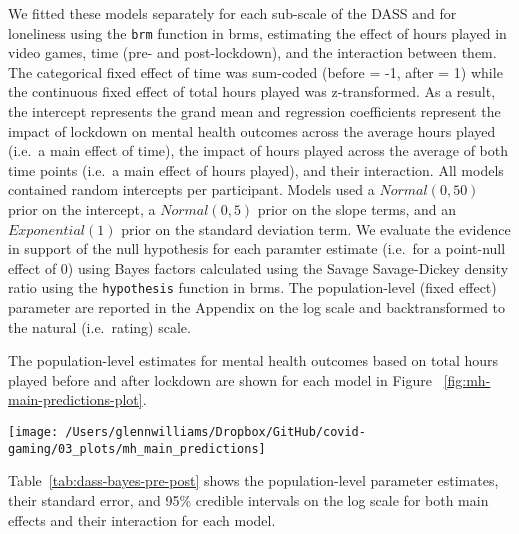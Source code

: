 \documentclass[
  english,
  jou,floatsintext]{apa6}
\begin{document}
We fitted these models separately for each sub-scale of the DASS and for loneliness using the \texttt{brm} function in brms, estimating the effect of hours played in video games, time (pre- and post-lockdown), and the interaction between them. The categorical fixed effect of time was sum-coded (before = -1, after = 1) while the continuous fixed effect of total hours played was z-transformed. As a result, the intercept represents the grand mean and regression coefficients represent the impact of lockdown on mental health outcomes across the average hours played (i.e.~a main effect of time), the impact of hours played across the average of both time points (i.e.~a main effect of hours played), and their interaction. All models contained random intercepts per participant. Models used a \(Normal(0, 50)\) prior on the intercept, a \(Normal(0, 5)\) prior on the slope terms, and an \(Exponential(1)\) prior on the standard deviation term. We evaluate the evidence in support of the null hypothesis for each paramter estimate (i.e.~for a point-null effect of 0) using Bayes factors calculated using the Savage Savage-Dickey density ratio using the \texttt{hypothesis} function in brms. The population-level (fixed effect) parameter are reported in the Appendix on the log scale and backtransformed to the natural (i.e.~rating) scale.

The population-level estimates for mental health outcomes based on total hours played before and after lockdown are shown for each model in Figure ~\ref{fig:mh-main-predictions-plot}.

\begin{figure*}[!htbp]

{\centering \texttt{[image: /Users/glennwilliams/Dropbox/GitHub/covid-gaming/03\_plots/mh\_main\_predictions]} 

}

\caption{Mental health outcomes for the depression, anxiety, stress, and loneliness measures as a function of total hours played before and during lockdown. Lines and ribbons indicate the posterior median ± 95\% credible intervals.}\label{fig:mh-main-predictions-plot}
\end{figure*}

Table~\ref{tab:dass-bayes-pre-post} shows the population-level parameter estimates, their standard error, and 95\% credible intervals on the log scale for both main effects and their interaction for each model.
\end{document}
